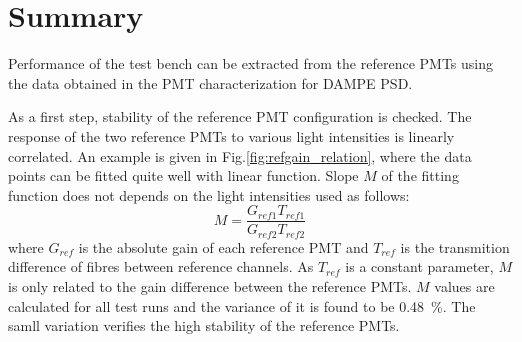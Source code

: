 \documentclass[5p, times]{elsarticle}
\begin{document}
\section{Summary}
\label{sec:summary}

Performance of the test bench can be extracted from the reference PMTs using the data obtained in the PMT characterization for DAMPE PSD.

As a first step, stability of the reference PMT configuration is checked.
The response of the two reference PMTs to various light intensities is linearly correlated.
An example is given in Fig.\ref{fig:refgain_relation}, where the data points can be fitted quite well with linear function.
Slope $M$ of the fitting function does not depends on the light intensities used as follows:
\begin{equation}
 M = \frac{G_{ref1} T_{ref1}}{G_{ref2} T_{ref2}}
\end{equation}
where $G_{ref}$ is the absolute gain of each reference PMT and $T_{ref}$ is the transmition difference of fibres between reference channels.
As $T_{ref}$ is a constant parameter, $M$ is only related to the gain difference between the reference PMTs.
$M$ values are calculated for all test runs and the variance of it is found to be \SI{0.48}{\percent}.
The samll variation verifies the high stability of the reference PMTs.
\end{document}
